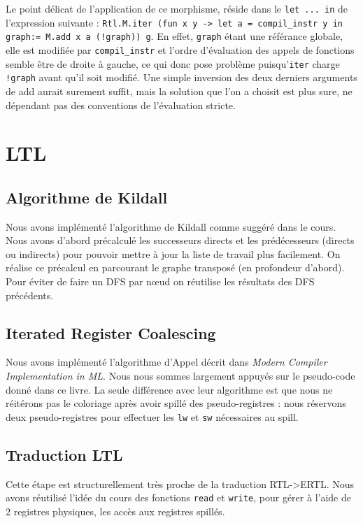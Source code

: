 \documentclass[a4paper]{article}
\begin{document}
Le point délicat de l'application de ce morphisme, réside dans le \texttt{let ... in} de l'expression suivante :
\texttt{Rtl.M.iter (fun x y -> let a = compil\_instr y in graph:= M.add
x a (!graph)) g}. En effet, \texttt{graph} étant une référance globale, elle est
modifiée par \texttt{compil\_instr} et l'ordre d'évaluation des appels
de fonctions semble être de droite à gauche, ce qui donc pose problème
puisqu'\texttt{iter} charge \texttt{!graph} avant qu'il soit modifié. Une simple inversion des
deux derniers arguments de add aurait surement suffit, mais la solution que l'on a choisit est
plus sure, ne dépendant pas des conventions de l'évaluation stricte.
\section{LTL}
\subsection{Algorithme de Kildall}

Nous avons implémenté l'algorithme de Kildall comme suggéré dans le cours. Nous avons d'abord précalculé
les successeurs directs et les prédécesseurs (directs ou indirects) pour pouvoir mettre à jour la liste de
travail plus facilement. On réalise ce précalcul en parcourant le graphe transposé (en profondeur d'abord).
Pour éviter de faire un DFS par nœud on réutilise les résultats des DFS précédents.

\subsection{Iterated Register Coalescing}

Nous avons implémenté l'algorithme d'Appel décrit dans \emph{Modern Compiler Implementation in ML}.
Nous nous sommes largement appuyés sur le pseudo-code donné dans ce livre. La seule différence avec
leur algorithme est que nous ne réitérons pas le coloriage après avoir spillé des pseudo-registres :
nous réservons deux pseudo-registres pour effectuer les \texttt{lw} et \texttt{sw} nécessaires au spill.
\subsection{Traduction LTL}

Cette étape est structurellement très proche de la traduction RTL->ERTL.
Nous avons réutilisé l'idée du cours des fonctions \texttt{read} et
\texttt{write}, pour gérer à l'aide de 2 registres physiques,
les accès aux registres spillés. 
\end{document}
